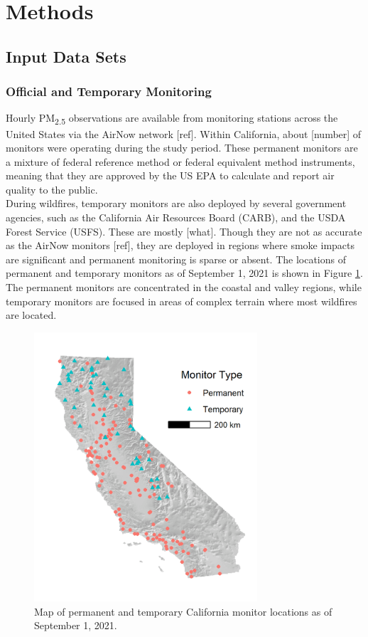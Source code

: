 \documentclass[gmd, manuscript]{copernicus}
\begin{document}
\section{Methods}

\subsection{Input Data Sets}

\subsubsection{Official and Temporary Monitoring}

Hourly PM\textsubscript{2.5} observations are available from monitoring
stations across the United States via the AirNow network {[}ref{]}.
Within California, about {[}number{]} of monitors were operating during
the study period. These permanent monitors are a mixture of federal
reference method or federal equivalent method instruments, meaning that
they are approved by the US EPA to calculate and report air quality to
the public.\\
During wildfires, temporary monitors are also deployed by several
government agencies, such as the California Air Resources Board (CARB),
and the USDA Forest Service (USFS). These are mostly {[}what{]}. Though
they are not as accurate as the AirNow monitors {[}ref{]}, they are
deployed in regions where smoke impacts are significant and permanent
monitoring is sparse or absent. The locations of permanent and temporary
monitors as of September 1, 2021 is shown in Figure \ref{fig:monitors}.
The permanent monitors are concentrated in the coastal and valley
regions, while temporary monitors are focused in areas of complex
terrain where most wildfires are located.

\begin{figure}[h]
\includegraphics[width=8.3cm]{./Figures/MonitorsGMD} \caption{Map of permanent and temporary California monitor locations as of September 1, 2021.}\label{fig:monitors}
\end{figure}
\end{document}
